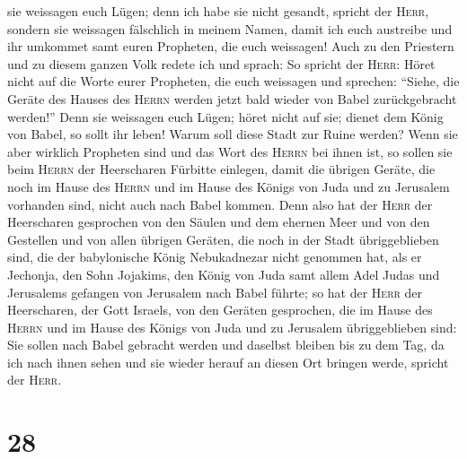 sie weissagen euch Lügen;  denn ich habe sie nicht
gesandt, spricht der \textsc{Herr}, sondern sie weissagen fälschlich in
meinem Namen, damit ich euch austreibe und ihr umkommet samt euren
Propheten, die euch weissagen!  Auch zu den Priestern und
zu diesem ganzen Volk redete ich und sprach: So spricht der
\textsc{Herr}: Höret nicht auf die Worte eurer Propheten, die euch
weissagen und sprechen: ``Siehe, die Geräte des Hauses des
\textsc{Herrn} werden jetzt bald wieder von Babel zurückgebracht
werden!'' Denn sie weissagen euch Lügen;  höret nicht auf
sie; dienet dem König von Babel, so sollt ihr leben! Warum soll diese
Stadt zur Ruine werden?  Wenn sie aber wirklich Propheten
sind und das Wort des \textsc{Herrn} bei ihnen ist, so sollen sie beim
\textsc{Herrn} der Heerscharen Fürbitte einlegen, damit die übrigen
Geräte, die noch im Hause des \textsc{Herrn} und im Hause des Königs von
Juda und zu Jerusalem vorhanden sind, nicht auch nach Babel kommen.
 Denn also hat der \textsc{Herr} der Heerscharen
gesprochen von den Säulen und dem ehernen Meer und von den Gestellen und
von allen übrigen Geräten, die noch in der Stadt übriggeblieben sind,
 die der babylonische König Nebukadnezar nicht genommen
hat, als er Jechonja, den Sohn Jojakims, den König von Juda samt allem
Adel Judas und Jerusalems gefangen von Jerusalem nach Babel führte;
 so hat der \textsc{Herr} der Heerscharen, der Gott
Israels, von den Geräten gesprochen, die im Hause des \textsc{Herrn} und
im Hause des Königs von Juda und zu Jerusalem übriggeblieben sind:
 Sie sollen nach Babel gebracht werden und daselbst
bleiben bis zu dem Tag, da ich nach ihnen sehen und sie wieder herauf an
diesen Ort bringen werde, spricht der \textsc{Herr}.

\hypertarget{section-27}{%
\section{28}\label{section-27}}

